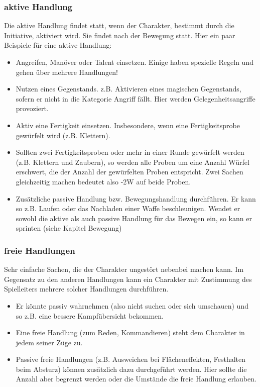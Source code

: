 \documentclass{article}
\begin{document}
\subsubsection{aktive Handlung}

Die aktive Handlung findet statt, wenn der Charakter, bestimmt durch die Initiative, aktiviert wird. Sie
findet nach der Bewegung statt. Hier ein paar Beispiele für eine aktive Handlung:

\begin{itemize}
\item Angreifen, Manöver oder Talent einsetzen. Einige haben spezielle Regeln und gehen über mehrere Handlungen!
\item Nutzen eines Gegenstands. z.B. Aktivieren eines magischen Gegenstands, sofern er nicht in die Kategorie Angriff fällt. Hier werden Gelegenheitsangriffe provoziert.
\item Aktiv eine Fertigkeit einsetzen. Insbesondere, wenn eine Fertigkeitsprobe gewürfelt wird (z.B. Klettern).
\item Sollten zwei Fertigkeitsproben oder mehr in einer Runde gewürfelt werden (z.B. Klettern und Zaubern), so werden alle Proben um eine Anzahl Würfel erschwert, die der Anzahl der gewürfelten Proben entspricht. Zwei Sachen gleichzeitig machen bedeutet also -2W auf beide Proben.
\item Zusätzliche passive Handlung bzw. Bewegungshandlung durchführen. Er kann so z.B. Laufen oder das Nachladen einer Waffe beschleunigen. Wendet er sowohl die aktive als auch passive Handlung für das Bewegen ein, so kann er sprinten (siehe Kapitel Bewegung)
\end{itemize}

\subsubsection{freie Handlungen}

Sehr einfache Sachen, die der Charakter ungestört nebenbei machen kann. Im Gegensatz zu den anderen Handlungen kann
ein Charakter mit Zustimmung des Spielleiters mehrere solcher Handlungen durchführen.

\begin{itemize}
\item Er könnte passiv wahrnehmen (also nicht suchen oder sich umschauen) und so z.B. eine bessere Kampfübersicht bekommen.
\item Eine freie Handlung (zum Reden, Kommandieren) steht dem Charakter in jedem seiner Züge zu.
\item Passive freie Handlungen (z.B. Ausweichen bei Flächeneffekten, Festhalten beim Absturz) können zusätzlich dazu durchgeführt werden. Hier sollte die Anzahl aber begrenzt werden oder die Umstände die freie Handlung erlauben.
\end{itemize}
\end{document}
